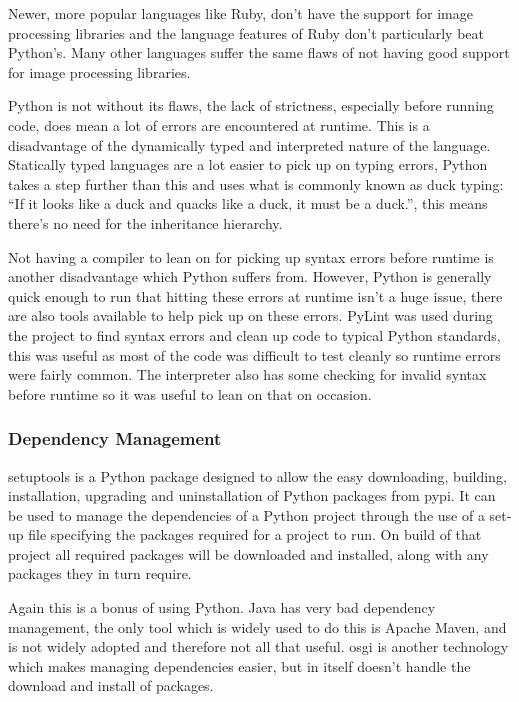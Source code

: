 Newer, more popular languages like Ruby, don't have the support for image processing libraries and
the language features of Ruby don't particularly beat Python's. Many other languages suffer the
same flaws of not having good support for image processing libraries.

Python is not without its flaws, the lack of strictness, especially before running code, does mean
a lot of errors are encountered at runtime. This is a disadvantage of the dynamically typed and
interpreted nature of the language. Statically typed languages are a lot easier to pick up on
typing errors, Python takes a step further than this and uses what is commonly known as duck
typing: ``If it looks like a duck and quacks like a duck, it must be a duck.''\cite{2013Glossary},
this means there's no need for the inheritance hierarchy. 

Not having a compiler to lean on for picking up syntax errors before runtime is another
disadvantage which Python suffers from. However, Python is generally quick enough to run that 
hitting these errors at runtime isn't a huge issue, there are also tools available to help pick up
on these errors. PyLint was used during the project to find syntax errors and clean up code to
typical Python standards, this was useful as most of the code was difficult to test cleanly so
runtime errors were fairly common. The interpreter also has some checking for invalid syntax 
before runtime so it was useful to lean on that on occasion.


\subsubsection{Dependency Management}
setuptools is a Python package designed to allow the easy downloading, building, 
installation, upgrading and uninstallation of Python packages from \gls{pypi}. It can be used to
manage the dependencies of a Python project through the use of a set-up file specifying the 
packages required for a project to run. On build of that project all required packages will be 
downloaded and installed, along with any packages they in turn require.

Again this is a bonus of using Python. Java has very bad dependency management, the only tool
which is widely used to do this is Apache Maven, and is not widely adopted and therefore not all
that useful. \Gls{osgi} is another technology which makes managing dependencies easier, but in 
itself doesn't handle the download and install of packages.

